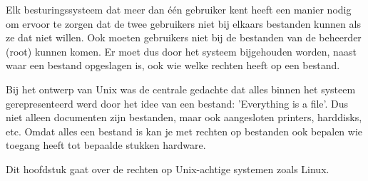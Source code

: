Elk besturingssysteem dat meer dan \'e\'en gebruiker kent heeft een manier nodig om ervoor te zorgen dat de twee gebruikers niet bij elkaars bestanden kunnen als ze dat niet willen. Ook moeten gebruikers niet bij de bestanden van de beheerder (root) kunnen komen. Er moet dus door het systeem bijgehouden worden, naast waar een bestand opgeslagen is, ook wie welke rechten heeft op een bestand.

Bij het ontwerp van Unix was de centrale gedachte dat alles binnen het systeem gerepresenteerd werd door het idee van een bestand: 'Everything is a file'. Dus niet alleen documenten zijn bestanden, maar ook aangesloten printers, harddisks, etc. Omdat alles een bestand is kan je met rechten op bestanden ook bepalen wie toegang heeft tot bepaalde stukken hardware.

Dit hoofdstuk gaat over de rechten op Unix-achtige systemen zoals Linux.

